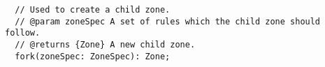 \begin{verbatim}
  // Used to create a child zone.
  // @param zoneSpec A set of rules which the child zone should follow.
  // @returns {Zone} A new child zone.
  fork(zoneSpec: ZoneSpec): Zone;
\end{verbatim}
